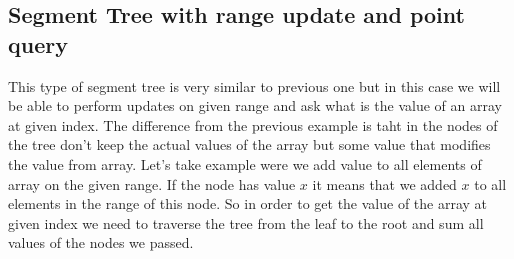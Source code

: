 \documentclass{article}
\begin{document}
\subsection{Segment Tree with range update and point query}
This type of segment tree is very similar to previous one but in this case we will be able
to perform updates on given range and ask what is the value of an array at given index.
The difference from the previous example is taht in the nodes of the tree don't keep the
actual values of the array but some value that modifies the value from array. 
Let's take example were we add value to all elements of array on the given range. 
If the node has value $x$ it means that we added $x$ to all elements in the range of this node.
So in order to get the value of the array at given index we need to traverse the tree 
from the leaf to the root and sum all values of the nodes we passed.
\end{document}
